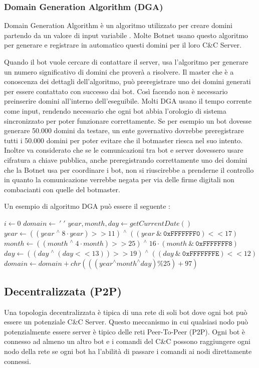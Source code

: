 \subsubsection{Domain Generation Algorithm (DGA)}
\label{DGA}
Domain Generation Algorithm è un algoritmo utilizzato per creare domini partendo da un valore di input variabile \cite{inproceedings}. Molte Botnet usano questo algoritmo per generare e registrare in automatico questi domini per il loro C\&C Server.

Quando il bot vuole cercare di contattare il server, usa l'algoritmo per generare un numero significativo di domini che proverà a risolvere. Il master che è a conoscenza dei dettagli dell'algoritmo, può preregistrare uno dei domini generati per essere contattato con successo dai bot.
Così facendo non è necessario preinserire domini all'interno dell'eseguibile.  Molti DGA usano il tempo corrente come input, rendendo necessario che ogni bot abbia l'orologio di sistema sincronizzato per poter funzionare correttamente. 
Se per esempio un bot dovesse generare 50.000 domini da testare, un ente governativo dovrebbe preregistrare tutti i 50.000 domini per poter evitare che il botmaster riesca nel suo intento. Inoltre va considerato che se le comunicazioni tra bot e server dovessero usare cifratura a chiave pubblica, anche preregistrando correttamente uno dei domini che la Botnet usa per coordinare i bot, non si riuscirebbe a prenderne il controllo in quanto la comunicazione verrebbe negata per via delle firme digitali non combacianti con quelle del botmaster.

Un esempio di algoritmo DGA può essere il seguente \cite{inproceedings}:

\begin{algorithmic}[1]
    \State $i \gets 0$
    \State $domain \gets \:  '\;'$
    \State $year, month, day \gets getCurrentDate()$
        \State $year \gets ((year \; ^  \wedge \; 8 \cdot year) >> 11) \; ^\wedge \; ((year \: \& \: \texttt{0xFFFFFFF0}) << 17) $
        \State $month \gets ((month   \;^ \wedge \; 4 \cdot month) >> 25) \; ^ \wedge \; 16 \cdot (month \: \& 
 \: \texttt{0xFFFFFFF8}) $
        \State $day \gets ((day \;^ \wedge \;(day << 13)) >> 19) \;^\wedge \; ((day \:\& \:\texttt{0xFFFFFFFE}) << 12) $
        \State $domain \gets domain + chr(((year ^\wedge month ^\wedge day) \% 25) + 97) $
    \EndWhile
\end{algorithmic}

\subsection{Decentralizzata (P2P)}
\label{TopologiaDecentralizzata}
Una topologia decentralizzata è tipica di una rete di soli bot dove ogni bot può essere un potenziale C\&C Server. Questo meccanismo in cui qualsiasi nodo può potenzialmente essere server è tipico delle reti Peer-To-Peer (P2P).
Ogni bot è connesso ad almeno un altro bot e i comandi del C\&C possono raggiungere ogni nodo della rete se ogni bot ha l'abilità di passare i comandi ai nodi direttamente connessi.



